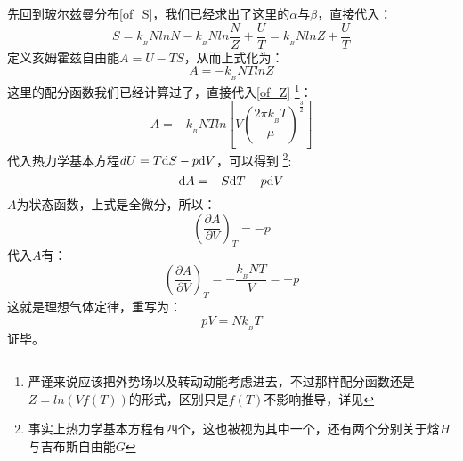         \begin{prove}
            先回到玻尔兹曼分布\ref{of_S}，我们已经求出了这里的$\alpha$与$\beta$，直接代入：
            \begin{equation}
                S = k_{_B}NlnN - k_{_B}Nln\frac{N}{Z} + \frac{U}{T} = k_{_B}NlnZ + \frac{U}{T}
            \end{equation}
            定义亥姆霍兹自由能$A=U-TS$，从而上式化为：
            \begin{equation}
                A = -k_{_B}NTlnZ
            \end{equation}
            这里的配分函数我们已经计算过了，直接代入\ref{of_Z}
            \footnote{严谨来说应该把外势场以及转动动能考虑进去，不过那样配分函数还是$Z=ln(Vf(T))$的形式，区别只是$f(T)$不影响推导，详见}：
            \begin{equation}
                A = -k_{_B}NTln\left[V\left(\frac{2\pi k_{_B}T}{\mu}\right)^{\frac{3}{2}}\right]
                \label{of_A}
            \end{equation}
            代入热力学基本方程$dU=T\mathrm{d}{S}-p\mathrm{d}{V}$，可以得到
            \footnote{事实上热力学基本方程有四个，这也被视为其中一个，还有两个分别关于焓$H$与吉布斯自由能$G$}:
            \begin{equation}
                \mathrm{d}{A} = -S\mathrm{d}{T} - p\mathrm{d}{V}
                \label{of_dif_A}
            \end{equation}
            $A$为状态函数，上式是全微分，所以：
            \begin{equation}
                \left(\frac{\partial A}{\partial V}\right)_{T} = -p
            \end{equation}
            代入$A$有：
            \begin{equation}
                \left(\frac{\partial A}{\partial V}\right)_{T} = -\frac{k_{_B}NT}{V} =-p
            \end{equation}
            这就是理想气体定律，重写为：
            \begin{equation}
                pV = Nk_{_B}T
            \end{equation}
            证毕。
        \end{prove}
